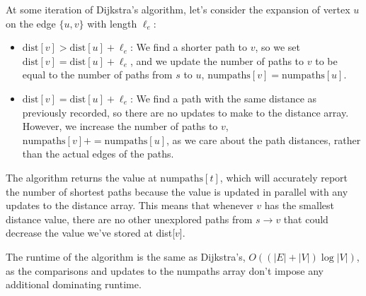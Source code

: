 \documentclass[11pt]{article}
\begin{document}
At some iteration of Dijkstra's algorithm, let's consider the expansion of vertex $u$ on the edge $\{u, v\}$ with length $\ell_e$:
\begin{itemize}
    \item $\text{dist}[v] > \text{dist}[u] + \ell_e$: We find a shorter path to $v$, so we set $\text{dist}[v] = \text{dist}[u] + \ell_e$, and we update the number of paths to $v$ to be equal to the number of paths from $s$ to $u$, $\text{numpaths}[v] = \text{numpaths}[u]$.
    \item $\text{dist}[v] = \text{dist}[u] + \ell_e$: We find a path with the same distance as previously recorded, so there are no updates to make to the distance array. However, we increase the number of paths to $v$, $\text{numpaths}[v] += \text{numpaths}[u]$, as we care about the path distances, rather than the actual edges of the paths.  
\end{itemize}
The algorithm returns the value at $\text{numpaths}[t]$, which will accurately report the number of shortest paths because the value is updated in parallel with any updates to the distance array. This means that whenever $v$ has the smallest distance value, there are no other unexplored paths from $s \to v$ that could decrease the value we've stored at dist[$v$].

\IncMargin{2em}
\begin{algorithm}[H]
    \footnotesize
    \DontPrintSemicolon
    \BlankLine
\end{algorithm}\DecMargin{2em} 


The runtime of the algorithm is the same as Dijkstra's, $O((|E| + |V|)\log|V|)$, as the comparisons and updates to the numpaths array don't impose any additional dominating runtime. 
\end{document}
